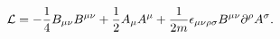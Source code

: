 \begin{equation}
\label{Lag} {\cal L}=
-\frac{1}{4}B_{\mu\nu}B^{\mu\nu}+\frac{1}{2}A_\mu A^\mu
+\frac{1}{2m}\epsilon_{\mu\nu\rho\sigma}B^{\mu\nu}\partial^\rho
A^\sigma.
\end{equation}

